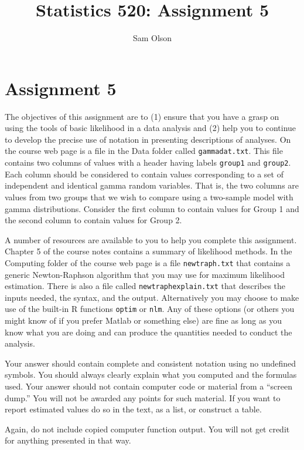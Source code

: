 \documentclass[
]{article}
\title{Statistics 520: Assignment 5}
\author{Sam Olson}
\date{}
\begin{document}
\maketitle

\section{Assignment 5}\label{assignment-5}

The objectives of this assignment are to (1) ensure that you have a
grasp on using the tools of basic likelihood in a data analysis and (2)
help you to continue to develop the precise use of notation in
presenting descriptions of analyses. On the course web page is a file in
the Data folder called \texttt{gammadat.txt}. This file contains two
columns of values with a header having labels \texttt{group1} and
\texttt{group2}. Each column should be considered to contain values
corresponding to a set of independent and identical gamma random
variables. That is, the two columns are values from two groups that we
wish to compare using a two-sample model with gamma distributions.
Consider the first column to contain values for Group 1 and the second
column to contain values for Group 2.

A number of resources are available to you to help you complete this
assignment. Chapter 5 of the course notes contains a summary of
likelihood methods. In the Computing folder of the course web page is a
file \texttt{newtraph.txt} that contains a generic Newton-Raphson
algorithm that you may use for maximum likelihood estimation. There is
also a file called \texttt{newtraphexplain.txt} that describes the
inputs needed, the syntax, and the output. Alternatively you may choose
to make use of the built-in R functions \texttt{optim} or \texttt{nlm}.
Any of these options (or others you might know of if you prefer Matlab
or something else) are fine as long as you know what you are doing and
can produce the quantities needed to conduct the analysis.

Your answer should contain complete and consistent notation using no
undefined symbols. You should always clearly explain what you computed
and the formulas used. Your answer should not contain computer code or
material from a ``screen dump.'' You will not be awarded any points for
such material. If you want to report estimated values do so in the text,
as a list, or construct a table.

Again, do not include copied computer function output. You will not get
credit for anything presented in that way.
\end{document}
